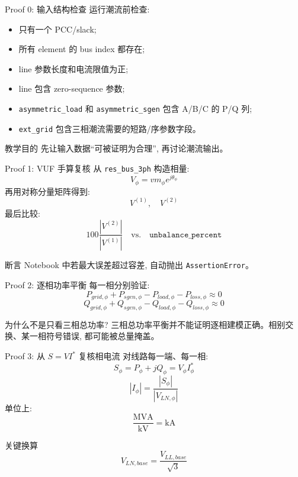 \documentclass[aspectratio=169,10pt]{ctexbeamer}
\newcommand{\code}[1]{\texttt{#1}}
\begin{document}
\begin{frame}{Proof 0: 输入结构检查}
运行潮流前检查:
\begin{itemize}
  \item 只有一个 PCC/slack;
  \item 所有 element 的 bus index 都存在;
  \item line 参数长度和电流限值为正;
  \item line 包含 zero-sequence 参数;
  \item \code{asymmetric\_load} 和 \code{asymmetric\_sgen} 包含 A/B/C 的 P/Q 列;
  \item \code{ext\_grid} 包含三相潮流需要的短路/序参数字段。
\end{itemize}
\begin{block}{教学目的}
先让输入数据“可被证明为合理”, 再讨论潮流输出。
\end{block}
\end{frame}

\begin{frame}{Proof 1: VUF 手算复核}
从 \code{res\_bus\_3ph} 构造相量:
\[
V_\phi = vm_\phi e^{j\theta_\phi}
\]
再用对称分量矩阵得到:
\[
V^{(1)},\quad V^{(2)}
\]
最后比较:
\[
100\frac{|V^{(2)}|}{|V^{(1)}|}
\quad \text{vs.}\quad
\code{unbalance\_percent}
\]
\begin{alertblock}{断言}
Notebook 中若最大误差超过容差, 自动抛出 \code{AssertionError}。
\end{alertblock}
\end{frame}

\begin{frame}{Proof 2: 逐相功率平衡}
每一相分别验证:
\[
P_{grid,\phi}+P_{sgen,\phi}-P_{load,\phi}-P_{loss,\phi}\approx 0
\]
\[
Q_{grid,\phi}+Q_{sgen,\phi}-Q_{load,\phi}-Q_{loss,\phi}\approx 0
\]
\vspace{0.5em}
\begin{block}{为什么不是只看三相总功率?}
三相总功率平衡并不能证明逐相建模正确。相别交换、某一相符号错误, 都可能被总量掩盖。
\end{block}
\end{frame}

\begin{frame}{Proof 3: 从 $S=VI^*$ 复核相电流}
对线路每一端、每一相:
\[
S_{\phi}=P_{\phi}+jQ_{\phi}=V_{\phi}I_{\phi}^{*}
\]
\[
|I_{\phi}|=\frac{|S_{\phi}|}{|V_{LN,\phi}|}
\]
单位上:
\[
\frac{\mathrm{MVA}}{\mathrm{kV}}=\mathrm{kA}
\]
\begin{alertblock}{关键换算}
\[
V_{LN,base}=\frac{V_{LL,base}}{\sqrt{3}}
\]
\end{alertblock}
\end{frame}
\end{document}
